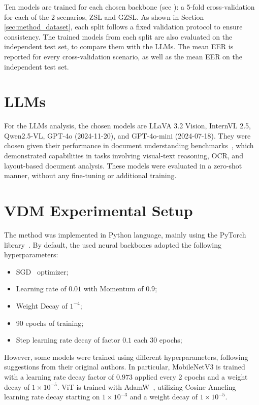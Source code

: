 Ten models are trained for each chosen backbone (see ): a 5-fold cross-validation for each of the 2 scenarios, \gls{ZSL} and \gls{GZSL}. As shown in Section \ref{sec:method_dataset}, each split follows a fixed validation protocol to ensure consistency. The trained models from each split are also evaluated on the independent test set, to compare them with the \gls{LLM}s. The mean \gls{EER} is reported for every cross-validation scenario, as well as the mean \gls{EER} on the independent test set.


\section{LLMs}

For the \glspl{LLM} analysis, the chosen models are LLaVA 3.2 Vision, InternVL 2.5, Qwen2.5-VL, GPT-4o (2024-11-20), and GPT-4o-mini (2024-07-18). They were chosen given their performance in document understanding benchmarks~\cite{bai_qwen25-vl_2025,ai_llama_2024}, which demonstrated capabilities in tasks involving visual-text reasoning, OCR, and layout-based document analysis. These models were evaluated in a zero-shot manner, without any fine-tuning or additional training.

\section{VDM Experimental Setup}

The method was implemented in Python language, mainly using the PyTorch library~\cite{paszke_pytorch_2019}. By default, the used neural backbones adopted the following hyperparameters:
\begin{itemize}
    \item \gls{SGD}~\cite{robbins_stochastic_1951} optimizer;
    \item Learning rate of $0.01$ with Momentum of $0.9$;
    \item Weight Decay of $1^{-4}$;
    \item 90 epochs of training;
    \item Step learning rate decay of factor $0.1$ each 30 epochs;
\end{itemize}
However, some models were trained using different hyperparameters, following suggestions from their original authors. In particular, MobileNetV3 is trained with a learning rate decay factor of $0.973$ applied every 2 epochs and a weight decay of $1 \times 10^{-5}$. ViT is trained with AdamW~\cite{kingma_adam_2015}, utilizing Cosine Anneling~\cite{liu_super_2022} learning rate decay starting on $1 \times 10^{-3}$ and a weight decay of $1 \times 10^{-5}$.

